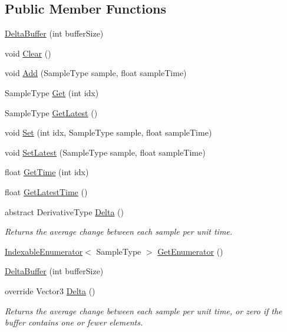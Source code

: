\subsection*{Public Member Functions}
\begin{DoxyCompactItemize}
\item 
\mbox{\hyperlink{class_leap_1_1_unity_1_1_delta_buffer_a0aad81ffe455c866ec1d59eb7467f392}{Delta\+Buffer}} (int buffer\+Size)
\item 
void \mbox{\hyperlink{class_leap_1_1_unity_1_1_delta_buffer_a19423be980871cc58ed3bf2e7d89b05e}{Clear}} ()
\item 
void \mbox{\hyperlink{class_leap_1_1_unity_1_1_delta_buffer_a570b88b4721427fabda06907c6481f95}{Add}} (Sample\+Type sample, float sample\+Time)
\item 
Sample\+Type \mbox{\hyperlink{class_leap_1_1_unity_1_1_delta_buffer_a1c44f3ee9a602076c7c1ae001e2289e5}{Get}} (int idx)
\item 
Sample\+Type \mbox{\hyperlink{class_leap_1_1_unity_1_1_delta_buffer_a76f2f9c6580529cac9412a922558b4f7}{Get\+Latest}} ()
\item 
void \mbox{\hyperlink{class_leap_1_1_unity_1_1_delta_buffer_ad3b9a4e7f743f8991b591d1ffd7db1c5}{Set}} (int idx, Sample\+Type sample, float sample\+Time)
\item 
void \mbox{\hyperlink{class_leap_1_1_unity_1_1_delta_buffer_abbd066336bcc8b7b937df00061ded48a}{Set\+Latest}} (Sample\+Type sample, float sample\+Time)
\item 
float \mbox{\hyperlink{class_leap_1_1_unity_1_1_delta_buffer_aeed56ed083b2c15bb7b9e0b2e4973509}{Get\+Time}} (int idx)
\item 
float \mbox{\hyperlink{class_leap_1_1_unity_1_1_delta_buffer_a80f1987c60828de0e6c96462338fc4f8}{Get\+Latest\+Time}} ()
\item 
abstract Derivative\+Type \mbox{\hyperlink{class_leap_1_1_unity_1_1_delta_buffer_a8700bc7a1676ba39977f58debf74f5df}{Delta}} ()
\begin{DoxyCompactList}\small\item\em Returns the average change between each sample per unit time. \end{DoxyCompactList}\item 
\mbox{\hyperlink{struct_leap_1_1_unity_1_1_indexable_enumerator}{Indexable\+Enumerator}}$<$ Sample\+Type $>$ \mbox{\hyperlink{class_leap_1_1_unity_1_1_delta_buffer_a12430bca3065eecc8084547cb8262f56}{Get\+Enumerator}} ()
\item 
\mbox{\hyperlink{class_leap_1_1_unity_1_1_delta_buffer_a0aad81ffe455c866ec1d59eb7467f392}{Delta\+Buffer}} (int buffer\+Size)
\item 
override Vector3 \mbox{\hyperlink{class_leap_1_1_unity_1_1_delta_buffer_a69fad13be5c6bd7117ad0343f6646b8e}{Delta}} ()
\begin{DoxyCompactList}\small\item\em Returns the average change between each sample per unit time, or zero if the buffer contains one or fewer elements. \end{DoxyCompactList}\end{DoxyCompactItemize}
